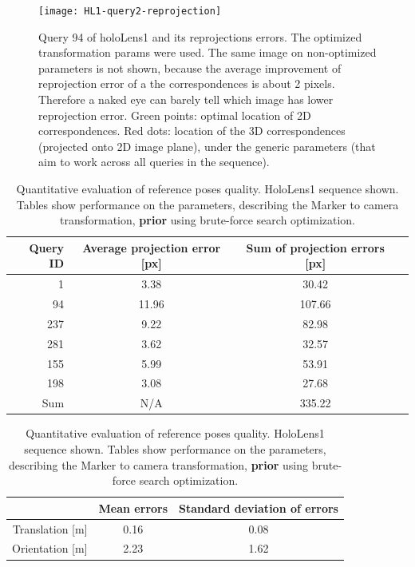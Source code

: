 \documentclass[twoside]{ctuthesis}
\theoremstyle{plain}
\theoremstyle{definition}
\theoremstyle{note}
\newcommand{\HLvsRefPosesErrorsCaption}{Estimate of reference vs ground truth poses errors. All the queries in the sequence were considered, with two kinds of exceptions. Queries, for which we do not have a reference pose (Vicon got lost) are not considered in the statistics. Queries for which we do not have a corresponding pose from HoloLens (due to the delay) are also not included in the statistics. Ground truth poses are estimated from the poses provided from HoloLens, after conversion to World coordinate system.}
\begin{document}
\begin{figure}
	\centering
 	\texttt{[image: HL1-query2-reprojection]}
 	\caption{Query 94 of holoLens1 and its reprojections errors. The optimized transformation params were used. The same image on non-optimized parameters is not shown, because the average improvement of reprojection error of a the correspondences is about 2 pixels. Therefore a naked eye can barely tell which image has lower reprojection error. Green points: optimal location of 2D correspondences. Red dots: location of the 3D correspondences (projected onto 2D image plane), under the generic parameters (that aim to work across all queries in the sequence).}
 	\label{fig:interesting-reprojection-s10e-query-2}
\end{figure} 

\begin{table}
	\begin{subtable}{.9\linewidth}\centering
		{
		\footnotesize
		\begin{tabular}{|r|c|c|c|}
			\hline
			Query ID & Average projection error [px] & Sum of projection errors [px] \\
			\hline
			1 & 3.38 & 30.42 \\
			94 & 11.96 & 107.66 \\
			237 & 9.22 & 82.98 \\
			281 & 3.62 & 32.57 \\
			155 & 5.99 & 53.91 \\
			198 & 3.08 & 27.68 \\
			\hline
			\hline
			Sum & N/A & 335.22 \\
			\hline
		\end{tabular}
		}
		\caption{Reprojection error.}
		\label{tab:interesting-reprojection-non-optimized-s10e}
	\quad
	\end{subtable}
	\begin{subtable}{.9\linewidth}\centering
		{
		\footnotesize
		\begin{tabular}{|r||c|c|}
			\hline
			& Mean errors & Standard deviation of errors \\
			\hline
			Translation [m] & 0.16 & 0.08 \\
			Orientation [m] & 2.23 & 1.62 \\
			\hline
		\end{tabular}
		}
		\caption{\HLvsRefPosesErrorsCaption{}}
		\label{tab:HL1-ref-non-optimized-vs-HL-errors}
	\end{subtable}
	\caption{Quantitative evaluation of reference poses quality. HoloLens1 sequence shown. Tables show performance on the parameters, describing the Marker to camera transformation, \textbf{prior} using brute-force search optimization.}
	\label{tab:HL1-ref-non-optimized-poses-errors}
\end{table}
\end{document}
